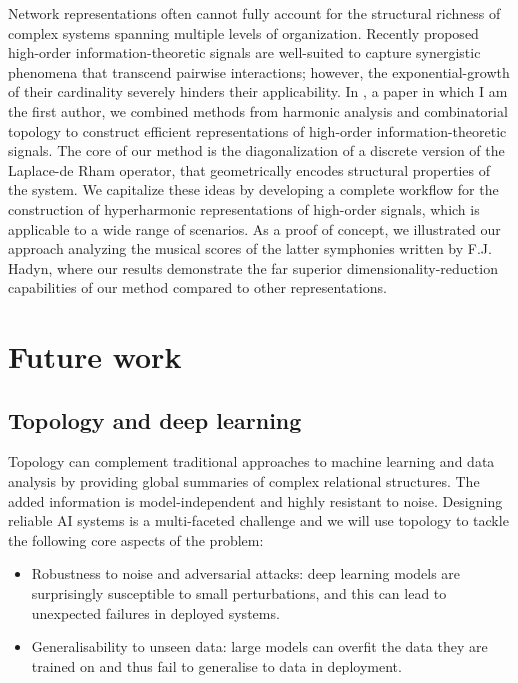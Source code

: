 Network representations often cannot fully account for the structural richness of complex systems spanning multiple levels of organization. Recently proposed high-order information-theoretic signals are well-suited to capture synergistic phenomena that transcend pairwise interactions; however, the exponential-growth of their cardinality severely hinders their applicability. In \cite{medina2021hyperharmonic}, a paper in which I am the first author, we combined methods from harmonic analysis and combinatorial topology to construct efficient representations of high-order information-theoretic signals.
The core of our method is the diagonalization of a discrete version of the Laplace-de Rham operator, that geometrically encodes structural properties of the system. We capitalize these ideas by developing a complete workflow for the construction of hyperharmonic representations of high-order signals, which is applicable to a wide range of scenarios. As a proof of concept, we illustrated our approach  analyzing the musical scores of the latter symphonies written by F.J. Hadyn, where our results demonstrate the far superior dimensionality-reduction capabilities of our method compared to other representations.

\section{Future work}

\subsection{Topology and deep learning} Topology can complement traditional approaches to machine learning and data analysis by providing global summaries of complex relational structures. The added information is model-independent and highly resistant to noise. Designing reliable AI systems is a multi-faceted challenge and we will use topology to tackle the following core aspects of the problem:

\begin{itemize}
	\item Robustness to noise and adversarial attacks: deep learning models are surprisingly susceptible to small perturbations, and this can lead to unexpected failures in deployed systems.

	\item Generalisability to unseen data: large models can overfit the data they are trained on and thus fail to generalise to data in deployment.
\end{itemize}


